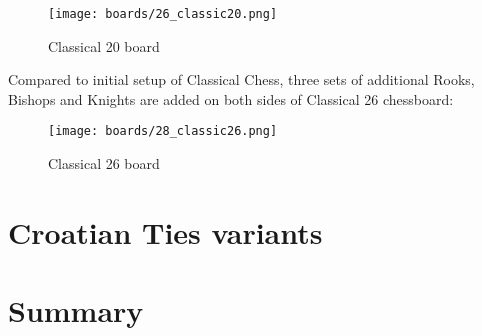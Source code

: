 \noindent
\begin{figure}[h]
\texttt{[image: boards/26\_classic20.png]}
\caption{Classical 20 board}
\label{fig:26_classic20}
\end{figure}

\vfill{}

\clearpage %

Compared to initial setup of Classical Chess, three sets of additional Rooks, Bishops
and Knights are added on both sides of Classical 26 chessboard:

\noindent
\begin{figure}[h]
\texttt{[image: boards/28\_classic26.png]}
\caption{Classical 26 board}
\label{fig:28_classic26}
\end{figure}

\vfill{}

\clearpage %

\section*{Croatian Ties variants}
\label{sec:Simple variants/Croatian Ties variants}

\TODO

\clearpage %

\section*{Summary}
\label{sec:Simple variants/Summary}

\TODO

\clearpage %
